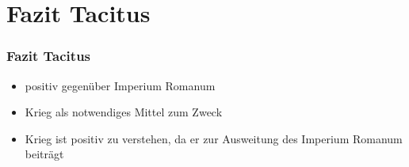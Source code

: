 \section{Fazit Tacitus}
	\begin{frame}
	\frametitle{Fazit Tacitus}
	\begin{itemize}
	\item<2->{positiv gegenüber Imperium Romanum\\}
	\item<3->{Krieg als notwendiges Mittel zum Zweck\\}
	\item<4->{Krieg ist positiv zu verstehen, da er zur Ausweitung des Imperium Romanum beiträgt\\}
	\end{itemize}
\end{frame}